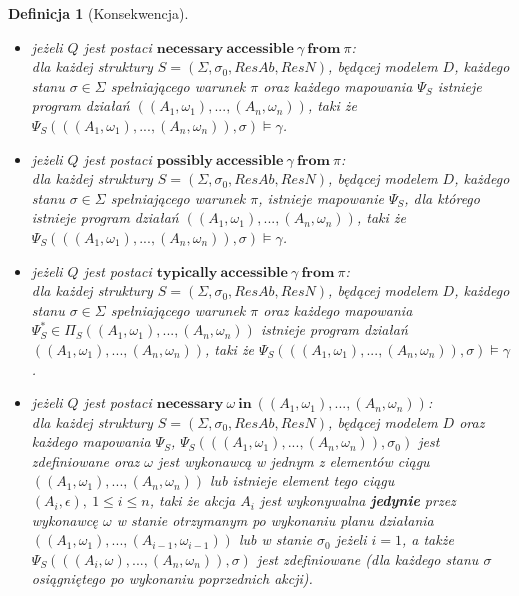 \documentclass[11pt,a4paper]{article}
\newtheorem{definition}{Definicja}[section]
\begin{document}
\begin{definition}[Konsekwencja]
\begin{itemize}
    	\item jeżeli $Q$ jest postaci $\mathbf{necessary}~\mathbf{accessible}~\gamma~\mathbf{from}~\pi$: \\
    	dla każdej struktury $S=(\Sigma, \sigma_0, ResAb, ResN)$, będącej modelem $D$, każdego stanu $\sigma \in \Sigma$ spełniającego warunek $\pi$ oraz każdego mapowania $\Psi_S$ istnieje program działań $((A_1, \omega_1), ..., (A_n, \omega_n))$, taki że $\Psi_S(((A_1, \omega_1), ..., (A_n, \omega_n)), \sigma) \models \gamma$.
    	
    	\item jeżeli $Q$ jest postaci $\mathbf{possibly}~\mathbf{accessible}~\gamma~\mathbf{from}~\pi$: \\
    	dla każdej struktury $S=(\Sigma, \sigma_0, ResAb, ResN)$, będącej modelem $D$, każdego stanu $\sigma \in \Sigma$ spełniającego warunek $\pi$, istnieje mapowanie $\Psi_S$, dla którego istnieje program działań $((A_1, \omega_1), ..., (A_n, \omega_n))$, taki że $\Psi_S(((A_1, \omega_1), ..., (A_n, \omega_n)), \sigma) \models \gamma$.
    	
    	\item jeżeli $Q$ jest postaci $\mathbf{typically}~\mathbf{accessible}~\gamma~\mathbf{from}~\pi$: \\
    	dla każdej struktury $S=(\Sigma, \sigma_0, ResAb, ResN)$, będącej modelem $D$, każdego stanu $\sigma \in \Sigma$ spełniającego warunek $\pi$ oraz każdego mapowania $\Psi_S^{*} \in \Pi_S((A_1, \omega_1),...,(A_n,\omega_n))$ istnieje program działań $((A_1, \omega_1), ..., (A_n, \omega_n))$, taki że $\Psi_S(((A_1, \omega_1), ..., (A_n, \omega_n)), \sigma) \models \gamma$.
    	
    	\item jeżeli $Q$ jest postaci $\mathbf{necessary}~\omega~\mathbf{in}~((A_1, \omega_1),...,(A_n,\omega_n))$: \\
    	 dla każdej struktury $S=(\Sigma, \sigma_0, ResAb, ResN)$, będącej modelem $D$ oraz każdego mapowania $\Psi_S$, $\Psi_S(((A_1, \omega_1), ..., (A_n, \omega_n)), \sigma_0)$ jest zdefiniowane oraz $\omega$ jest wykonawcą w jednym z elementów ciągu $((A_1, \omega_1),...,(A_n,\omega_n))$ lub istnieje element tego ciągu $(A_i, \epsilon),~1 \leq i \leq n$, taki że akcja $A_i$ jest wykonywalna \textbf{jedynie} przez wykonawcę $\omega$ w stanie otrzymanym po wykonaniu planu działania $((A_1, \omega_1),...,(A_{i-1},\omega_{i-1}))$ lub w stanie $\sigma_0$ jeżeli $i=1$, a także $\Psi_S(((A_i, \omega), ..., (A_n, \omega_n)), \sigma)$ jest zdefiniowane (dla każdego stanu $\sigma$ osiągniętego po wykonaniu poprzednich akcji).
    	 

\end{itemize}
\end{definition}
\end{document}
